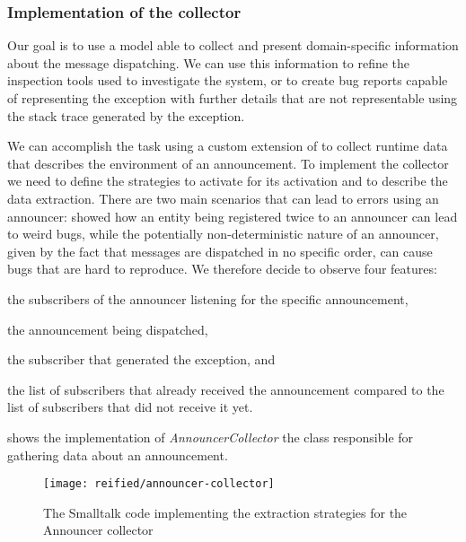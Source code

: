 \subsubsection{Implementation of the collector}

Our goal is to use a model able to collect and present domain-specific information about the message dispatching.
We can use this information to refine the inspection tools used to investigate the system, or to create bug reports capable of representing the exception with further details that are not representable using the stack trace generated by the exception.

We can accomplish the task using a custom extension of \sln to collect runtime data that describes the environment of an announcement.
To implement the collector we need to define the strategies to activate for its activation and to describe the data extraction.
There are two main scenarios that can lead to errors using an announcer:  showed how an entity being registered twice to an announcer can lead to weird bugs, while the potentially non-deterministic nature of an announcer, given by the fact that messages are dispatched in no specific order, can cause bugs that are hard to reproduce.
We therefore decide to observe four features:
%
\begin{inparaenum}[(1)]
  \item the subscribers of the announcer listening for the specific announcement,
  \item the announcement being dispatched,
  \item the subscriber that generated the exception, and
  \item the list of subscribers that already received the announcement compared to the list of subscribers that did not receive it yet.
\end{inparaenum}
%
 shows the implementation of \textit{AnnouncerCollector} the class responsible for gathering data about an announcement.

\begin{figure}[h]
\centering
\texttt{[image: reified/announcer-collector]}
\caption{The Smalltalk code implementing the extraction strategies for the Announcer collector}
\label{fig:announcer-code}
\end{figure}

